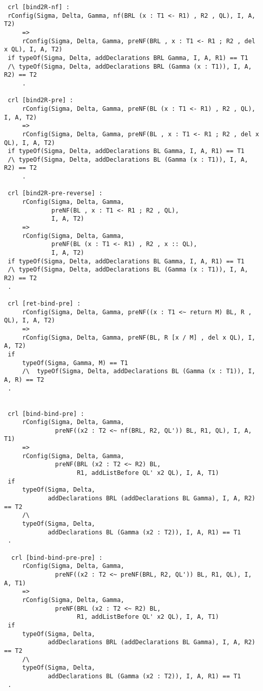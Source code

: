 \begin{lstlisting}
 crl [bind2R-nf] :   
 rConfig(Sigma, Delta, Gamma, nf(BRL (x : T1 <- R1) , R2 , QL), I, A, T2)
     =>
     rConfig(Sigma, Delta, Gamma, preNF(BRL , x : T1 <- R1 ; R2 , del x QL), I, A, T2) 
 if typeOf(Sigma, Delta, addDeclarations BRL Gamma, I, A, R1) == T1
 /\ typeOf(Sigma, Delta, addDeclarations BRL (Gamma (x : T1)), I, A, R2) == T2 
     .
    
 crl [bind2R-pre] :
     rConfig(Sigma, Delta, Gamma, preNF(BL (x : T1 <- R1) , R2 , QL), I, A, T2)
     =>
     rConfig(Sigma, Delta, Gamma, preNF(BL , x : T1 <- R1 ; R2 , del x QL), I, A, T2) 
 if typeOf(Sigma, Delta, addDeclarations BL Gamma, I, A, R1) == T1
 /\ typeOf(Sigma, Delta, addDeclarations BL (Gamma (x : T1)), I, A, R2) == T2 
     .
  
 crl [bind2R-pre-reverse] :
     rConfig(Sigma, Delta, Gamma, 
             preNF(BL , x : T1 <- R1 ; R2 , QL), 
             I, A, T2)
     =>
     rConfig(Sigma, Delta, Gamma, 
             preNF(BL (x : T1 <- R1) , R2 , x :: QL),
             I, A, T2) 
 if typeOf(Sigma, Delta, addDeclarations BL Gamma, I, A, R1) == T1
 /\ typeOf(Sigma, Delta, addDeclarations BL (Gamma (x : T1)), I, A, R2) == T2
 .  
 
 crl [ret-bind-pre] :
     rConfig(Sigma, Delta, Gamma, preNF((x : T1 <~ return M) BL, R , QL), I, A, T2) 
     =>
     rConfig(Sigma, Delta, Gamma, preNF(BL, R [x / M] , del x QL), I, A, T2) 
 if
     typeOf(Sigma, Gamma, M) == T1 
     /\  typeOf(Sigma, Delta, addDeclarations BL (Gamma (x : T1)), I, A, R) == T2 
 .    

 
 crl [bind-bind-pre] :
     rConfig(Sigma, Delta, Gamma, 
              preNF((x2 : T2 <~ nf(BRL, R2, QL')) BL, R1, QL), I, A, T1)
     =>  
     rConfig(Sigma, Delta, Gamma, 
              preNF(BRL (x2 : T2 <~ R2) BL, 
                    R1, addListBefore QL' x2 QL), I, A, T1) 
 if  
     typeOf(Sigma, Delta, 
            addDeclarations BRL (addDeclarations BL Gamma), I, A, R2) == T2
     /\          
     typeOf(Sigma, Delta, 
            addDeclarations BL (Gamma (x2 : T2)), I, A, R1) == T1
 .  
 
  crl [bind-bind-pre-pre] :
     rConfig(Sigma, Delta, Gamma, 
              preNF((x2 : T2 <~ preNF(BRL, R2, QL')) BL, R1, QL), I, A, T1)
     =>  
     rConfig(Sigma, Delta, Gamma, 
              preNF(BRL (x2 : T2 <~ R2) BL, 
                    R1, addListBefore QL' x2 QL), I, A, T1) 
 if  
     typeOf(Sigma, Delta, 
            addDeclarations BRL (addDeclarations BL Gamma), I, A, R2) == T2
     /\          
     typeOf(Sigma, Delta, 
            addDeclarations BL (Gamma (x2 : T2)), I, A, R1) == T1
 . 
            

\end{lstlisting}
